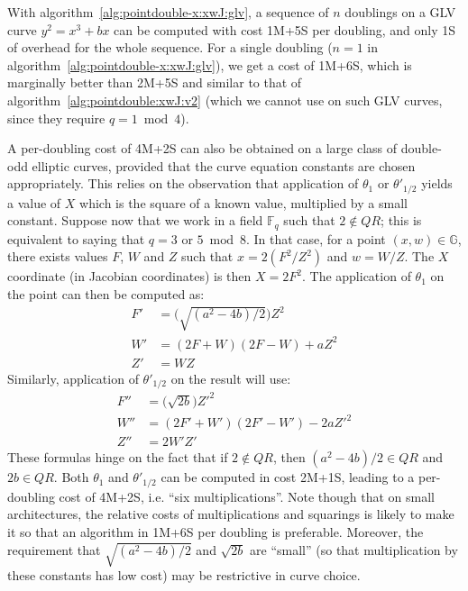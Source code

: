 \documentclass{llncs}
\newcommand{\QR}{QR}
\newcommand{\bF}{\mathbb{F}}
\newcommand{\bG}{\mathbb{G}}
\begin{document}
With algorithm~\ref{alg:pointdouble-x:xwJ:glv}, a sequence of $n$ doublings
on a GLV curve $y^2 = x^3 + bx$ can be computed with cost 1M+5S per
doubling, and only 1S of overhead for the whole sequence. For
a single doubling ($n = 1$ in algorithm~\ref{alg:pointdouble-x:xwJ:glv}),
we get a cost of 1M+6S, which is marginally better than 2M+5S and
similar to that of algorithm~\ref{alg:pointdouble:xwJ:v2} (which we
cannot use on such GLV curves, since they require $q = 1\bmod 4$).

A per-doubling cost of 4M+2S can also be obtained on a large class of
double-odd elliptic curves, provided that the curve equation constants
are chosen appropriately. This relies on the observation that
application of $\theta_1$ or $\theta'_{1/2}$ yields a value of $X$ which
is the square of a known value, multiplied by a small constant. Suppose
now that we work in a field $\bF_q$ such that $2\notin \QR$; this is
equivalent to saying that $q = 3$ or $5 \bmod 8$. In that case, for a
point $(x,w) \in \bG$, there exists values $F$, $W$ and $Z$ such that
$x = 2(F^2/Z^2)$ and $w = W/Z$. The $X$ coordinate (in Jacobian
coordinates) is then $X = 2F^2$. The application of $\theta_1$ on
the point can then be computed as:
\begin{align*}
    F' &= \Big(\sqrt{(a^2-4b)/2}\Big) Z^2 \\
    W' &= (2F + W)(2F - W) + a Z^2 \\
    Z' &= WZ
\end{align*}
Similarly, application of $\theta'_{1/2}$ on the result will use:
\begin{align*}
    F'' &= \Big(\sqrt{2b}\Big) Z'^2 \\
    W'' &= (2F' + W')(2F' - W') - 2a Z'^2 \\
    Z'' &= 2W'Z'
\end{align*}
These formulas hinge on the fact that if $2 \notin \QR$, then $(a^2-4b)/2
\in \QR$ and $2b \in \QR$. Both $\theta_1$ and $\theta'_{1/2}$ can be
computed in cost 2M+1S, leading to a per-doubling cost of 4M+2S, i.e.
``six multiplications''. Note though that on small architectures, the
relative costs of multiplications and squarings is likely to make it so
that an algorithm in 1M+6S per doubling is preferable. Moreover, the
requirement that $\sqrt{(a^2-4b)/2}$ and $\sqrt{2b}$ are ``small'' (so
that multiplication by these constants has low cost) may be restrictive
in curve choice.
\end{document}
